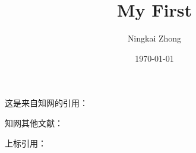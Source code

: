 \documentclass{article}
\title{My First}
\author{Ningkai Zhong}
\date{\today}
\begin{document}
\maketitle
这是来自知网的引用： \cite{weilai}

知网其他文献： \parencite{beijin}

上标引用： \supercite{jiyuhe}

\printbibliography[title=参考文献]
\end{document}
